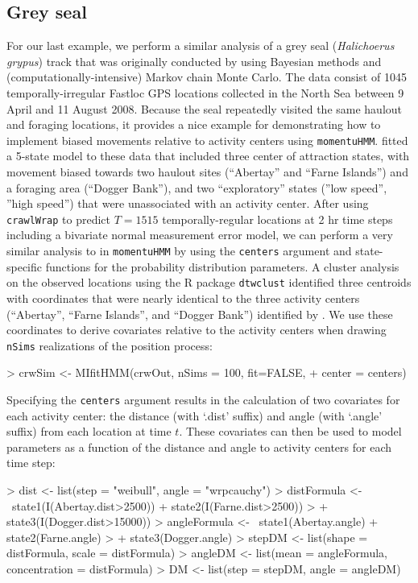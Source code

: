 \documentclass[12pt]{article}
\begin{document}
\subsection{Grey seal}
\label{sec:greySeal}
For our last example, we perform a similar analysis of a grey seal ({\it Halichoerus grypus}) track that was originally conducted by \cite{McClintockEtAl2012} using Bayesian methods and (computationally-intensive) Markov chain Monte Carlo. The data consist of 1045 temporally-irregular Fastloc GPS locations collected in the North Sea between 9 April and 11 August 2008. Because the seal repeatedly visited the same haulout and foraging locations, it provides a nice example for demonstrating how to implement biased movements relative to activity centers using \verb|momentuHMM|. \cite{McClintockEtAl2012} fitted a 5-state model to these data that included three center of attraction states, with movement biased towards two haulout sites (``Abertay'' and ``Farne Islands'') and a foraging area (``Dogger Bank''), and two ``exploratory'' states (''low speed'', ''high speed'') that were unassociated with an activity center. After using \verb|crawlWrap| to predict $T=1515$ temporally-regular locations at 2 hr time steps including a bivariate normal measurement error model, we can perform a very similar analysis to \cite{McClintockEtAl2012} in \verb|momentuHMM| by using the \verb|centers| argument and state-specific functions for the probability distribution parameters. A cluster analysis on the observed locations using the R package \verb|dtwclust| \citep{SardaEspinosa2017} identified three centroids with coordinates that were nearly identical to the three activity centers (``Abertay'', ``Farne Islands'', and ``Dogger Bank'') identified by \cite{McClintockEtAl2012}. We use these coordinates to derive covariates relative to the activity centers when drawing \verb|nSims| realizations of the position process:
\begin{Schunk}
\begin{Sinput}
> crwSim <- MIfitHMM(crwOut, nSims = 100, fit=FALSE,
+                   center = centers)
\end{Sinput}
\end{Schunk}
Specifying the \verb|centers| argument results in the calculation of two covariates for each activity center: the distance (with `.dist' suffix) and angle (with `.angle' suffix) from each location at time $t$. These covariates can then be used to model parameters as a function of the distance and angle to activity centers for each time step:
\begin{Schunk}
\begin{Sinput}
> dist <- list(step = "weibull", angle = "wrpcauchy")
> distFormula <- ~state1(I(Abertay.dist>2500)) + state2(I(Farne.dist>2500)) 
>                   + state3(I(Dogger.dist>15000))
> angleFormula <- ~state1(Abertay.angle) + state2(Farne.angle) 
>                   + state3(Dogger.angle)
> stepDM <- list(shape = distFormula, scale = distFormula)
> angleDM <- list(mean = angleFormula, concentration = distFormula)
> DM <- list(step = stepDM, angle = angleDM)
\end{Sinput}
\end{Schunk}
\end{document}
